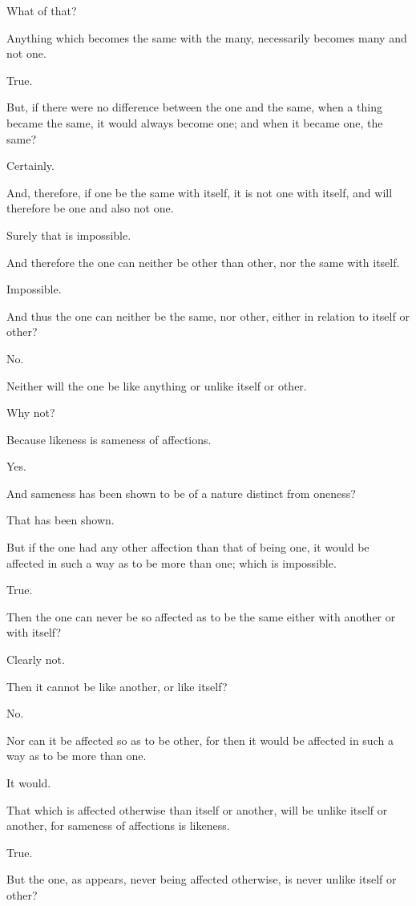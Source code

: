 What of that?

Anything which becomes the same with the many, necessarily becomes many
and not one.

True.

But, if there were no difference between the one and the same, when a
thing became the same, it would always become one; and when it became
one, the same?

Certainly.

And, therefore, if one be the same with itself, it is not one with
itself, and will therefore be one and also not one.

Surely that is impossible.

And therefore the one can neither be other than other, nor the same with
itself.

Impossible.

And thus the one can neither be the same, nor other, either in relation
to itself or other?

No.

Neither will the one be like anything or unlike itself or other.

Why not?

Because likeness is sameness of affections.

Yes.

And sameness has been shown to be of a nature distinct from oneness?

That has been shown.

But if the one had any other affection than that of being one, it would
be affected in such a way as to be more than one; which is impossible.

True.

Then the one can never be so affected as to be the same either with
another or with itself?

Clearly not.

Then it cannot be like another, or like itself?

No.

Nor can it be affected so as to be other, for then it would be affected
in such a way as to be more than one.

It would.

That which is affected otherwise than itself or another, will be unlike
itself or another, for sameness of affections is likeness.

True.

But the one, as appears, never being affected otherwise, is never unlike
itself or other?

